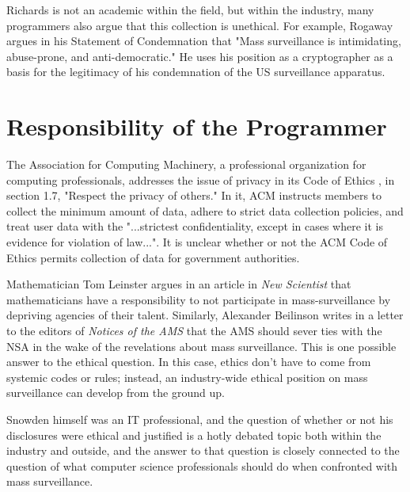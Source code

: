 \documentclass{sig-alternate-05-2015}
\begin{document}
Richards is not an academic within the field, but within the industry, many
programmers also argue that this collection is unethical. For example, Rogaway
argues in his Statement of Condemnation \cite{rogaway} that "Mass surveillance
is intimidating, abuse-prone, and anti-democratic." He uses his position as a
cryptographer as a basis for the legitimacy of his condemnation of the US 
surveillance apparatus.

\section{Responsibility of the Programmer}

The Association for Computing Machinery, a professional organization for
computing professionals, addresses the issue of privacy in its Code of
Ethics \cite{ethics}, in section 1.7, "Respect the privacy of others." In it,
ACM instructs members to collect the minimum amount of data, adhere to strict
data collection policies, and treat user data with the "...strictest
confidentiality, except in cases where it is evidence for violation of law...".
It is unclear whether or not the ACM Code of Ethics permits collection of data
for government authorities.

Mathematician Tom Leinster argues in an article in \textit{New Scientist}
\cite{leinster} that mathematicians have a responsibility to not participate in
mass-surveillance by depriving agencies of their talent. Similarly, Alexander
Beilinson writes in a letter \cite{beilinson} to the editors of \textit{Notices
of the AMS} that the AMS should sever ties with the NSA in the wake of the
revelations about mass surveillance. This is one possible answer to the ethical
question. In this case, ethics don't have to come from systemic codes or rules;
instead, an industry-wide ethical position on mass surveillance can develop
from the ground up.

Snowden himself was an IT professional, and the question of whether or not his
disclosures were ethical and justified is a hotly debated topic both within the
industry and outside, and the answer to that question is closely connected to
the question of what computer science professionals should do when confronted
with mass surveillance.



\end{document}
